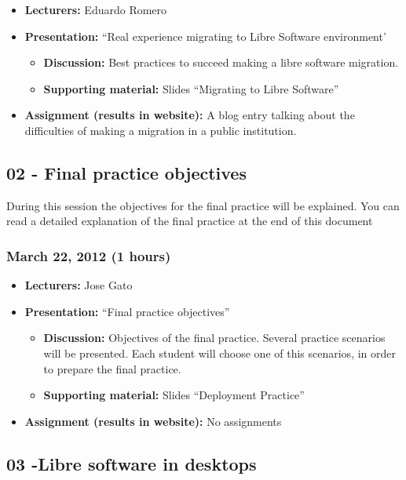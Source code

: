 \documentclass[a4paper]{article}
\begin{document}
\begin{itemize}
\item \textbf{Lecturers:} Eduardo Romero
\item \textbf{Presentation:} ``Real experience migrating to Libre Software environment'
  \begin{itemize}
  \item \textbf{Discussion:} Best practices to succeed making a libre software migration. 
  \item \textbf{Supporting material:} Slides ``Migrating to Libre Software''
  \end{itemize}
\item \textbf{Assignment (results in website):} A blog entry talking about the difficulties of making a migration in a public institution. 
\end{itemize}

\subsection{02 - Final practice objectives}

During this session the objectives for the final practice will be explained. You can read a detailed explanation of the final practice at the end of this document

\subsubsection{March 22, 2012 (1 hours)}

\begin{itemize}
\item \textbf{Lecturers:} Jose Gato
\item \textbf{Presentation:} ``Final practice objectives''
  \begin{itemize}
  \item \textbf{Discussion:} Objectives of the final practice. Several practice scenarios will be presented. Each student will choose one of this scenarios, in order to prepare the final practice.
  \item \textbf{Supporting material:} Slides ``Deployment Practice''
  \end{itemize}
\item \textbf{Assignment (results in website):} No assignments 
\end{itemize}



\subsection{03 -Libre software in desktops}
\end{document}
